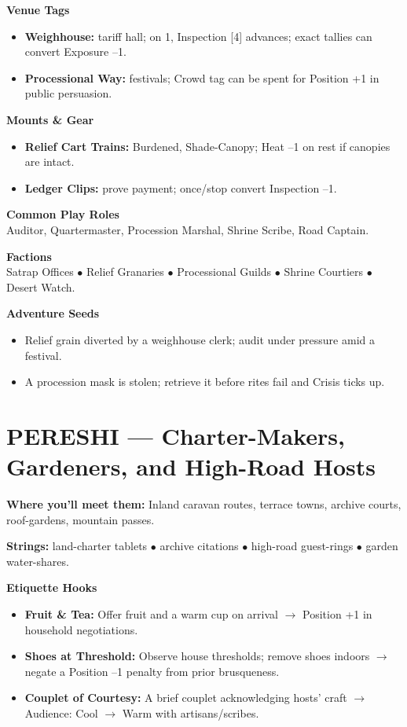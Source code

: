 \documentclass[11pt]{article}
\begin{document}
\textbf{Venue Tags}
\begin{itemize}
\item \textbf{Weighhouse:} tariff hall; on 1, Inspection [4] advances; exact tallies can convert Exposure --1.
\item \textbf{Processional Way:} festivals; Crowd tag can be spent for Position +1 in public persuasion.
\end{itemize}

\textbf{Mounts \& Gear}
\begin{itemize}
\item \textbf{Relief Cart Trains:} Burdened, Shade-Canopy; Heat --1 on rest if canopies are intact.
\item \textbf{Ledger Clips:} prove payment; once/stop convert Inspection --1.
\end{itemize}

\textbf{Common Play Roles}\\
Auditor, Quartermaster, Procession Marshal, Shrine Scribe, Road Captain.

\textbf{Factions}\\
Satrap Offices $\bullet$ Relief Granaries $\bullet$ Processional Guilds $\bullet$ Shrine Courtiers $\bullet$ Desert Watch.

\textbf{Adventure Seeds}
\begin{itemize}
\item Relief grain diverted by a weighhouse clerk; audit under pressure amid a festival.
\item A procession mask is stolen; retrieve it before rites fail and Crisis ticks up.
\end{itemize}

\section*{PERESHI --- Charter-Makers, Gardeners, and High-Road Hosts}

\textbf{Where you'll meet them:} Inland caravan routes, terrace towns, archive courts, roof-gardens, mountain passes.

\textbf{Strings:} land-charter tablets $\bullet$ archive citations $\bullet$ high-road guest-rings $\bullet$ garden water-shares.

\textbf{Etiquette Hooks}
\begin{itemize}
\item \textbf{Fruit \& Tea:} Offer fruit and a warm cup on arrival $\rightarrow$ Position +1 in household negotiations.
\item \textbf{Shoes at Threshold:} Observe house thresholds; remove shoes indoors $\rightarrow$ negate a Position --1 penalty from prior brusqueness.
\item \textbf{Couplet of Courtesy:} A brief couplet acknowledging hosts' craft $\rightarrow$ Audience: Cool $\rightarrow$ Warm with artisans/scribes.
\end{itemize}
\end{document}
